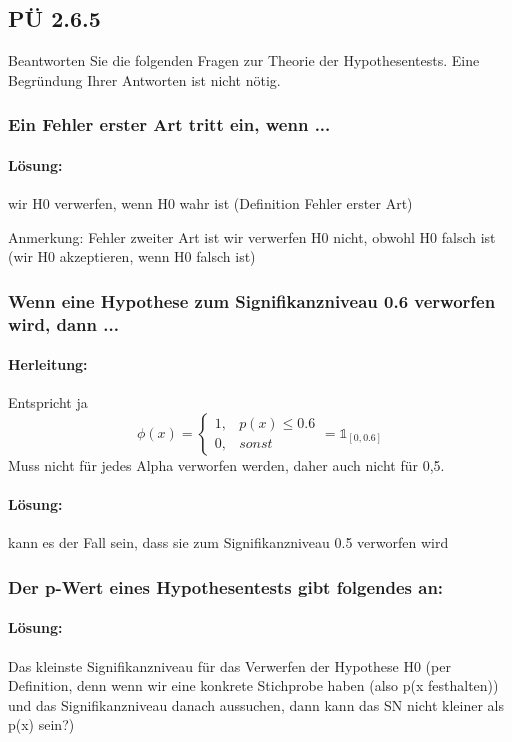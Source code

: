 \subsection{PÜ 2.6.5 \abhaken}\label{sec:pu-2.6.5}
Beantworten Sie die folgenden Fragen zur Theorie der \gls{Hypothesentest}s. Eine Begründung Ihrer
Antworten ist nicht nötig.
\begin{auf}
    \subsubsection*{Ein Fehler erster Art tritt ein, wenn ...}
    \paragraph{Lösung:} wir H0 verwerfen, wenn H0 wahr ist (Definition \gls{Fehler erster Art})
\end{auf}
Anmerkung: Fehler zweiter Art ist wir verwerfen H0 nicht, obwohl H0 falsch ist (wir H0 akzeptieren, wenn H0 falsch ist)


\begin{auf}
    \subsubsection*{Wenn eine Hypothese zum Signifikanzniveau 0.6 verworfen wird, dann ...}
    \paragraph{Herleitung:}
    Entspricht ja
   \[
       \phi(x) = \begin{cases}
                     1, & p(x) \leq 0.6 \\ %
                     0, & sonst
       \end{cases} = \mathbb{1}_{[0, 0.6]}
   \]
    Muss nicht für jedes Alpha verworfen werden, daher auch nicht für 0,5.
    \paragraph{Lösung:} kann es der Fall sein, dass sie zum Signifikanzniveau 0.5 verworfen wird
\end{auf}

\begin{auf}
    \subsubsection*{Der p-Wert eines Hypothesentests gibt folgendes an:}
    \paragraph{Lösung:} Das kleinste Signifikanzniveau für das Verwerfen der Hypothese H0 (per Definition, denn wenn
    wir eine konkrete Stichprobe haben (also p(x festhalten)) und das Signifikanzniveau danach aussuchen, dann kann
    das SN nicht kleiner als p(x) sein?)
\end{auf}


